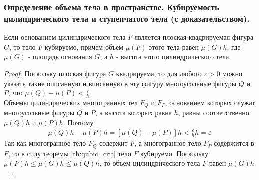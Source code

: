 \documentclass[10pt]{article}
\begin{document}
    \subsubsection{Определение объема тела в пространстве. Кубируемость цилиндрического тела и ступенчатого тела (с доказательством).}
    \begin{definition}
    \end{definition}
    \begin{corollary}
        Если основанием цилиндрического тела $F$ является плоская квадрируемая фигура $G$, то тело $F$ кубируемо, причем объем $\mu(F)$ этого тела равен $\mu(G)h$, где $\mu(G)$ - площадь основания $G$, а $h$ - высота этого цилиндрического тела.
    \end{corollary}
    \begin{proof}
        Поскольку плоская фигура $G$ квадрируема, то для любого $\varepsilon > 0$ можно указать такие описанную и вписанную в эту фигуру многоугольные фигуры $Q$ и $P$, что $\mu(Q) - \mu(P) < \frac{\varepsilon}{h}$\\
        Объемы цилиндрических многогранных тел $F_Q$ и $F_P$, основанием которых служат многоугольные фигуры $Q$ и $P$, а высота которых равна $h$, равны соответственно $\mu(Q)h$ и $\mu(P)h$. Поэтому
        \begin{gather*}
            \mu(Q)h - \mu(P)h = \left[ \mu(Q) - \mu(P) \right] h < \frac{\varepsilon}{h} h = \varepsilon
        \end{gather*}
        Так как многогранное тело $F_Q$ содержит $F$, а многогранное тело $F_P$ содержится в $F$, то в силу теоремы \ref{th:qubic_crit} тело $F$ кубируемо. Поскольку $\mu(P)h \leq \mu(G)h \leq \mu(Q)h$, то объем цилиндрического тела $F$ равен $\mu(G)h$
    \end{proof}
\end{document}
